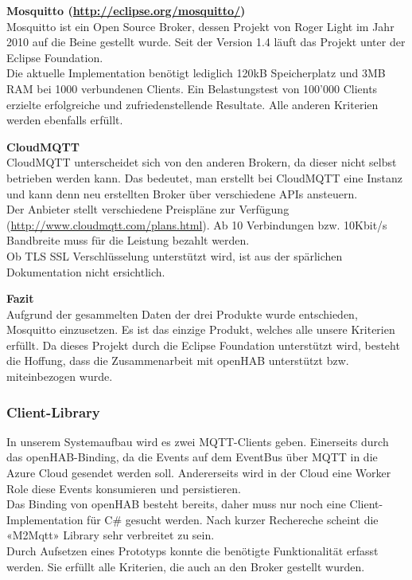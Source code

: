 \textbf{Mosquitto (\url{http://eclipse.org/mosquitto/})}\\
Mosquitto ist ein Open Source Broker, dessen Projekt von Roger Light im Jahr 2010 auf die Beine gestellt wurde. Seit der Version 1.4 läuft das Projekt unter der Eclipse Foundation. \\
Die aktuelle Implementation benötigt lediglich 120kB Speicherplatz und 3MB RAM bei 1000 verbundenen Clients. Ein Belastungstest von 100'000 Clients erzielte erfolgreiche und zufriedenstellende Resultate.
Alle anderen Kriterien werden ebenfalls erfüllt.

\textbf{CloudMQTT} \\
CloudMQTT unterscheidet sich von den anderen Brokern, da dieser nicht selbst betrieben werden kann. Das bedeutet, man erstellt bei CloudMQTT eine Instanz und kann denn neu erstellten Broker über verschiedene APIs ansteuern. \\
Der Anbieter stellt verschiedene Preispläne zur Verfügung (\url{http://www.cloudmqtt.com/plans.html}). Ab 10 Verbindungen bzw. 10Kbit/s Bandbreite muss für die Leistung bezahlt werden. \\
Ob TLS SSL Verschlüsselung unterstützt wird, ist aus der spärlichen Dokumentation nicht ersichtlich.

\textbf{Fazit} \\
Aufgrund der gesammelten Daten der drei Produkte wurde entschieden, Mosquitto einzusetzen. Es ist das einzige Produkt, welches alle unsere Kriterien erfüllt. Da dieses Projekt durch die Eclipse Foundation unterstützt wird, besteht die Hoffung, dass die Zusammenarbeit mit openHAB unterstützt bzw. miteinbezogen wurde.

\subsubsection{Client-Library}
In unserem Systemaufbau wird es zwei MQTT-Clients geben. Einerseits durch das openHAB-Binding, da die Events auf dem EventBus über MQTT in die Azure Cloud gesendet werden soll. Andererseits wird in der Cloud eine Worker Role diese Events konsumieren und persistieren. \\
Das Binding von openHAB besteht bereits, daher muss nur noch eine Client-Implementation für C\# gesucht werden. Nach kurzer Rechereche scheint die «M2Mqtt» Library sehr verbreitet zu sein. \\
Durch Aufsetzen eines Prototyps konnte die benötigte Funktionalität erfasst werden. Sie erfüllt alle Kriterien, die auch an den Broker gestellt wurden.

